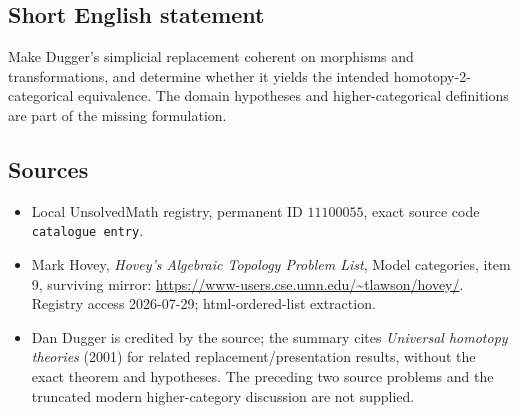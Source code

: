 \documentclass[11pt]{article}
\begin{document}
\subsection{Short English statement}
Make Dugger's simplicial replacement coherent on morphisms and transformations, and determine whether it yields the intended homotopy-2-categorical equivalence. The domain hypotheses and higher-categorical definitions are part of the missing formulation.
\subsection{Sources}
\begin{itemize}
\item Local UnsolvedMath registry, permanent ID \(11100055\), exact source code \texttt{catalogue entry}.
\item Mark Hovey, \emph{Hovey's Algebraic Topology Problem List}, Model categories, item 9, surviving mirror: \url{https://www-users.cse.umn.edu/~tlawson/hovey/}. Registry access 2026-07-29; html-ordered-list extraction.
\item Dan Dugger is credited by the source; the summary cites \emph{Universal homotopy theories} (2001) for related replacement/presentation results, without the exact theorem and hypotheses. The preceding two source problems and the truncated modern higher-category discussion are not supplied.
\end{itemize}
\end{document}
